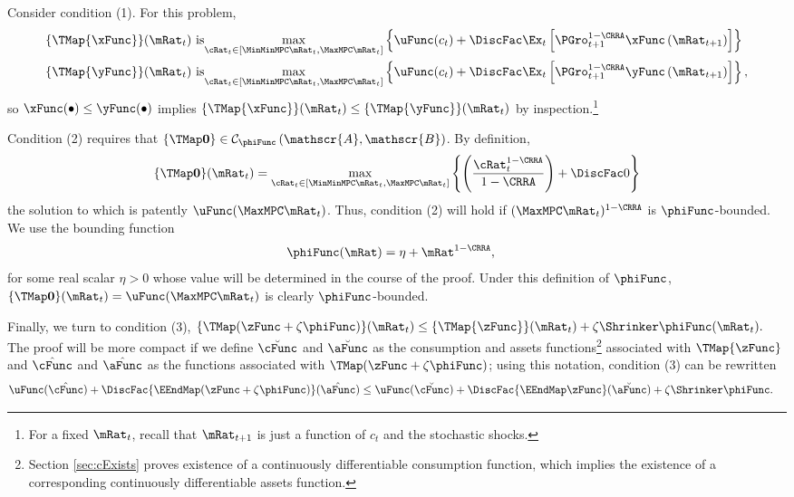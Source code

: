 \documentclass[\econtexRoot/BufferStockTheory]{subfiles}
\begin{document}
Consider condition (1). For this problem,
\begin{align*}
\{\TMap{\mathfrak{\xFunc}}\}(\mRat_{t}) &\mbox{~is}\underset{\cRat_{t} \in
[\MinMinMPC \mRat_{t}, \MaxMPC \mRat_{t}]
}\max \left\{
\uFunc(c_{t})+\DiscFac \Ex_{t}\left[ {\PGro}_{t+1}^{1-\CRRA }{\mathfrak{\xFunc}}
\left( {\mRat}_{t+1}\right) \right] \right\}  \notag  \label{eq:condition1}
\\
\{\TMap{\mathfrak{\yFunc}}\}(\mRat_{t}) &\mbox{~is}\underset{\cRat_{t} \in
[\MinMinMPC \mRat_{t}, \MaxMPC \mRat_{t}]
}\max \left\{
\uFunc(c_{t})+\DiscFac \Ex_{t}\left[ {\PGro}_{t+1}^{1-\CRRA }{\mathfrak{\yFunc}}
\left( {\mRat}_{t+1}\right) \right] \right\} ,  \notag
\end{align*}%
so ${\mathfrak{\xFunc}}(\bullet) \leq {\mathfrak{\yFunc}}(\bullet)$ implies $\{\TMap{\mathfrak{\xFunc}}\}(\mRat_{t}) \leq \{\TMap{\mathfrak{\yFunc}} \}(\mRat_{t})$ by inspection.\footnote{For a fixed $\mRat_{t}$, recall that ${\mRat}_{t+1}$ is just a function of $c_{t}$ and the
stochastic shocks.}

Condition (2) requires that $\{\TMap\mathbf{0}\}\in \mathcal{C}_{\phiFunc}\left(\mathscr{A},\mathscr{B}\right)$. By definition,
\begin{equation*}
\{\TMap \mathbf{0}\}(\mRat_{t}) = \max_{\cRat_{t} \in
[\MinMinMPC \mRat_{t}, \MaxMPC \mRat_{t}]
}\left\{ \left( \frac{\cRat_{t}^{1-\CRRA }}{1-\CRRA }\right) +\DiscFac 0\right\}
\end{equation*}
the solution to which is patently
$\uFunc(\MaxMPC \mRat_{t})$. Thus, condition (2)
will hold if $(\MaxMPC \mRat_{t})^{1-\CRRA}$ is $\phiFunc$-bounded.  We use
the bounding function
\begin{equation}\begin{gathered}\begin{aligned}
  \label{eq:phiFunc}
  \phiFunc(\mRat)  & = \eta + \mRat^{1-\CRRA},
\end{aligned}\end{gathered}\end{equation}
for some real scalar $\eta > 0$ whose value will be determined in the
course of the proof. Under this definition of $\phiFunc$,
$\{\TMap\mathbf{0}\}(\mRat_{t})= \uFunc(\MaxMPC \mRat_{t})$
is clearly
$\phiFunc$-bounded.

Finally, we turn to condition (3), $\{\TMap({\zFunc} +\zeta\phiFunc
)\}(\mRat_{t}) \leq \{\TMap{\zFunc}\}(\mRat_{t}) +\zeta \Shrinker
\phiFunc(\mRat_{t}).$ The proof will be more compact if we define
$\breve{\cFunc}$ and $\breve{\aFunc}$ as the consumption and assets
functions\footnote{Section \ref{sec:cExists} proves existence of a
  continuously differentiable consumption function, which implies the
  existence of a corresponding continuously differentiable assets
  function.}  associated with $\TMap{\zFunc}$ and $\hat{\cFunc}$ and
$\hat{\aFunc}$ as the functions associated with $\TMap({\zFunc+\zeta
  \phiFunc})$; using this notation, condition (3) can be rewritten
\begin{align*}
\uFunc(\hat{\cFunc})+\DiscFac \{\EEndMap (\zFunc+\zeta \phiFunc) \}(\hat{\aFunc})  & \leq  \uFunc(\breve{\cFunc})+\DiscFac \{\EEndMap \zFunc \}(\breve{\aFunc})  + \zeta \Shrinker \phiFunc.
\end{align*}
\end{document}
